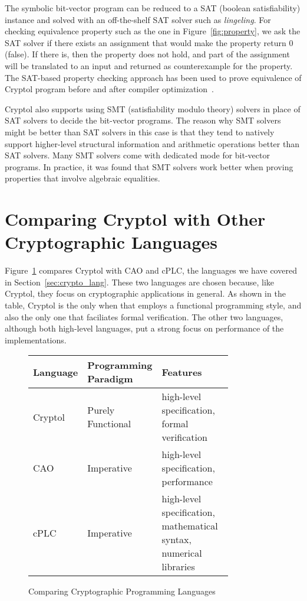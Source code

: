 \documentclass[a4paper, notitlepage]{report}
\begin{document}
The symbolic bit-vector program can be reduced to a SAT (boolean satisfiability)
instance and solved with an
off-the-shelf SAT solver such as \emph{lingeling}. For checking equivalence property
such as the one in Figure~\ref{fig:property}, we ask the SAT solver if there exists
an assignment that would make the property return 0 (false). If there is, then the
property does not hold, and part of the assignment will be translated to an input
and returned as counterexample for the property. The SAT-based property checking
approach has been used to prove equivalence of Cryptol program before and after
compiler optimization~\cite{erkok2009pragmatic}.

Cryptol also supports using SMT (satisfiability modulo theory)
solvers in place of SAT solvers to decide the
bit-vector programs. The reason why SMT solvers might be better than SAT solvers
in this case is that they tend to natively support higher-level structural information
and arithmetic operations better than SAT solvers. Many SMT solvers come with dedicated
mode for bit-vector programs. In practice, it was found that SMT solvers work better
when proving properties that involve algebraic equalities.


\section{Comparing Cryptol with Other Cryptographic Languages}

Figure~\ref{fig:compare} compares Cryptol with CAO and cPLC, the languages we have
covered in Section~\ref{sec:crypto_lang}. These two languages are chosen because,
like Cryptol, they focus on cryptographic applications in general. As shown in the
table, Cryptol is the only when that employs a functional programming style, and
also the only one that faciliates formal verification. The other two languages,
although both high-level languages, put a strong focus on performance of the
implementations.

\begin{figure}
  \begin{center}
    \begin{tabular}{|l | p{0.2\linewidth} | p{0.6\linewidth} |}
      \hline
      Language & Programming Paradigm & Features \\
      \hline
      Cryptol & Purely Functional  & high-level specification, formal verification \\
      \hline
      CAO~\cite{moss2010bridging} & Imperative & high-level specification, performance \\
      \hline
      cPLC~\cite{bangerter2011cplc} & Imperative & high-level specification, mathematical syntax, numerical libraries \\
      \hline
    \end{tabular}
  \end{center}
  \caption{Comparing Cryptographic Programming Languages}
  \label{fig:compare}
\end{figure}
\end{document}
